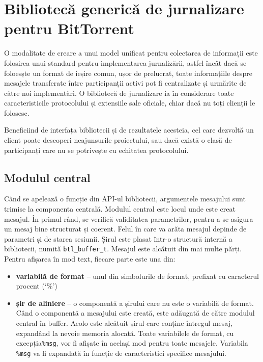 \section{Bibliotecă generică de jurnalizare pentru BitTorrent}
\label{sec:proto-measure:log-library}

O modalitate de creare a unui model unificat pentru colectarea de informații
este folosirea unui standard pentru implementarea jurnalizării, astfel încât
dacă se foloesște un format de ieșire comun, ușor de prelucrat, toate
informațiile despre mesajele transferate între participanții activi pot fi
centralizate și urmărite de către noi implementări. O bibliotecă de jurnalizare
ia în considerare toate caracteristicile protocolului și extensiile sale
oficiale, chiar dacă nu toți clienții le folosesc.

Beneficiind de interfața bibliotecii și de rezultatele acesteia, cel care
dezvoltă un client poate descoperi neajunsurile proiectului, sau dacă există
o clasă de participanți care nu se potrivește cu echitatea protocolului.

\subsection{Modulul central}

Când se apelează o funcție din API-ul bibliotecii, argumentele mesajului sunt
trimise la componenta centrală. Modulul central este locul unde
este creat mesajul. În primul rând, se verifică validitatea parametrilor, pentru
a se asigura un mesaj bine structurat și coerent. Felul în care va arăta
mesajul depinde de parametri și de starea sesiunii. Șirul este plasat
într-o structură internă a bibliotecii, numită \texttt{btl\_buffer\_t}.
Mesajul este alcătuit din mai multe părți. Pentru afișarea în mod text,
fiecare parte este una din:

\begin{itemize}
  \item \textbf{variabilă de format} -- unul din simbolurile de format,
  prefixat cu caracterul procent (`\%')
  \item \textbf{șir de aliniere} -- o componentă a șirului care nu este o
  variabilă de format. Când o componentă a mesajului este creată, este adăugată
  de către modulul central în buffer. Acolo este alcătuit șirul care conține
  întregul mesaj, expandând la nevoie memoria alocată. Toate variabilele de
  format, cu excepția\texttt{\%msg}, vor fi afișate în același mod pentru
  toate mesajele. Variabila \texttt{\%msg} va fi expandată în funcție de
  caracteristici specifice mesajului.
\end{itemize}


